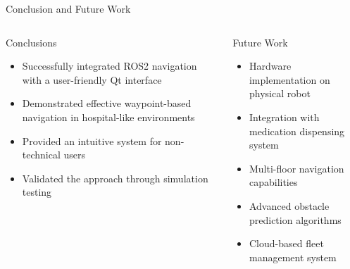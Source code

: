 \documentclass[aspectratio=169]{beamer}
\begin{document}
\begin{frame}{Conclusion and Future Work}
	\begin{columns}
		\begin{column}{0.5\textwidth}
			\begin{block}{Conclusions}
				\begin{itemize}
					\item Successfully integrated ROS2 navigation with a user-friendly Qt interface
					\item Demonstrated effective waypoint-based navigation in hospital-like environments
					\item Provided an intuitive system for non-technical users
					\item Validated the approach through simulation testing
				\end{itemize}
			\end{block}
		\end{column}
		\begin{column}{0.5\textwidth}
			\begin{alertblock}{Future Work}
				\begin{itemize}
					\item Hardware implementation on physical robot
					\item Integration with medication dispensing system
					\item Multi-floor navigation capabilities
					\item Advanced obstacle prediction algorithms
					\item Cloud-based fleet management system
				\end{itemize}
			\end{alertblock}
		\end{column}
	\end{columns}
\end{frame}
\end{document}

